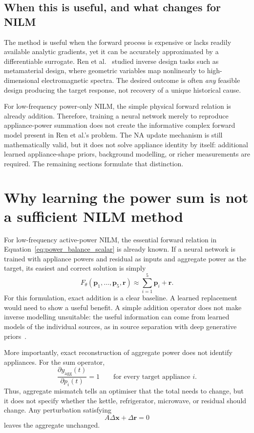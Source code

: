 \documentclass[11pt]{article}
\newcommand{\vect}[1]{\mathbf{#1}}
\begin{document}
\subsection{When this is useful, and what changes for NILM}

The method is useful when the forward process is expensive or lacks readily available analytic gradients, yet it can be accurately approximated by a differentiable surrogate. Ren et al.~\cite{ren2020} studied inverse design tasks such as metamaterial design, where geometric variables map nonlinearly to high-dimensional electromagnetic spectra. The desired outcome is often \emph{any} feasible design producing the target response, not recovery of a unique historical cause.

For low-frequency power-only NILM, the simple physical forward relation is already addition. Therefore, training a neural network merely to reproduce appliance-power summation does not create the informative complex forward model present in Ren et al.'s problem. The NA update mechanism is still mathematically valid, but it does not solve appliance identity by itself: additional learned appliance-shape priors, background modelling, or richer measurements are required. The remaining sections formulate that distinction.

\section{Why learning the power sum is not a sufficient NILM method}

For low-frequency active-power NILM, the essential forward relation in Equation~\eqref{eq:power_balance_scalar} is already known. If a neural network is trained with appliance powers and residual as inputs and aggregate power as the target, its easiest and correct solution is simply
\begin{equation}
    F_{\theta}(\vect{p}_1,\ldots,\vect{p}_5,\vect{r})
    \approx \sum_{i=1}^{5}\vect{p}_i+\vect{r}.
    \label{eq:learned_sum}
\end{equation}
For this formulation, exact addition is a clear baseline. A learned replacement would need to show a useful benefit. A simple addition operator does not make inverse modelling unsuitable: the useful information can come from learned models of the individual sources, as in source separation with deep generative priors~\cite{jayaram2020}.

More importantly, exact reconstruction of aggregate power does not identify appliances. For the sum operator,
\begin{equation}
    \frac{\partial y_{\mathrm{agg}}(t)}{\partial p_i(t)}=1
    \qquad \text{for every target appliance }i.
    \label{eq:equal_gradient}
\end{equation}
Thus, aggregate mismatch tells an optimiser that the total needs to change, but it does not specify whether the kettle, refrigerator, microwave, or residual should change. Any perturbation satisfying
\begin{equation}
    A\Delta\vect{x}+\Delta\vect{r}=0
    \label{eq:null_space}
\end{equation}
leaves the aggregate unchanged.
\end{document}
